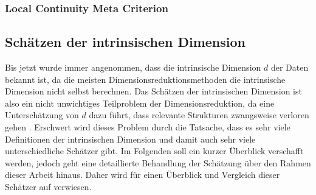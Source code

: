 
\subsubsection{Local Continuity Meta Criterion}

\subsection{Schätzen der intrinsischen Dimension}
\label{ch:Vergleich:sec:Methodik:subsec:SchaetzenDerIntrinsischenDim}

Bis jetzt wurde immer angenommen, dass die intrinsische Dimension $d$ der Daten bekannt ist, da die
meisten Dimensionsreduktionsmethoden die intrinsische Dimension nicht selbst berechnen. Das
Schätzen der intrinsischen Dimension ist also ein nicht unwichtiges Teilproblem der
Dimensionsreduktion, da eine Unterschätzung von $d$ dazu führt, dass relevante Strukturen
zwangsweise verloren gehen \parencite[1]{Levina.2004}. Erschwert wird dieses Problem durch die Tatsache, dass es sehr viele
Definitionen der intrinsischen Dimension und damit auch sehr viele unterschiedliche Schätzer gibt.
Im Folgenden soll ein kurzer Überblick verschafft werden, jedoch geht eine detaillierte Behandlung
der Schätzung über den Rahmen dieser Arbeit hinaus. Daher wird für einen Überblick und Vergleich
dieser Schätzer auf \textcites{Campadelli.2015}{Bac.2021}{Verveer.1995} verwiesen.

